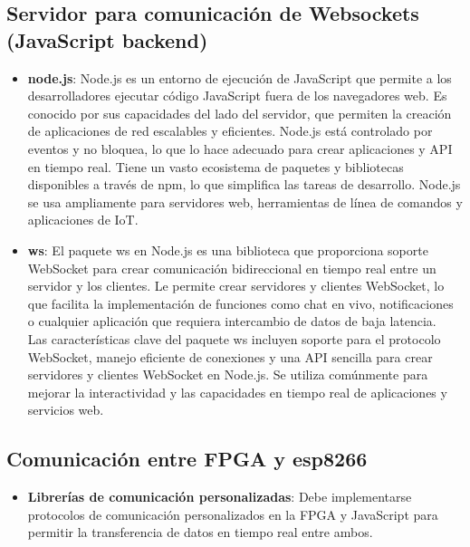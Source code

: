 \documentclass[journal]{IEEEtran}
\begin{document}
\subsection*{Servidor para comunicación de Websockets (JavaScript backend)}
\begin{itemize}
    \item \textbf{node.js}: 
    Node.js es un entorno de ejecución de JavaScript que permite a los desarrolladores ejecutar código JavaScript fuera de los navegadores web. Es conocido por sus capacidades del lado del servidor, que permiten la creación de aplicaciones de red escalables y eficientes. Node.js está controlado por eventos y no bloquea, lo que lo hace adecuado para crear aplicaciones y API en tiempo real. Tiene un vasto ecosistema de paquetes y bibliotecas disponibles a través de npm, lo que simplifica las tareas de desarrollo. Node.js se usa ampliamente para servidores web, herramientas de línea de comandos y aplicaciones de IoT.
    \item \textbf{ws}:
    El paquete ws en Node.js es una biblioteca que proporciona soporte WebSocket para crear comunicación bidireccional en tiempo real entre un servidor y los clientes. Le permite crear servidores y clientes WebSocket, lo que facilita la implementación de funciones como chat en vivo, notificaciones o cualquier aplicación que requiera intercambio de datos de baja latencia.
    \\
    Las características clave del paquete ws incluyen soporte para el protocolo WebSocket, manejo eficiente de conexiones y una API sencilla para crear servidores y clientes WebSocket en Node.js. Se utiliza comúnmente para mejorar la interactividad y las capacidades en tiempo real de aplicaciones y servicios web.

\end{itemize}



\subsection*{Comunicación entre FPGA y esp8266}

\begin{itemize}
  \item \textbf{Librerías de comunicación personalizadas}: Debe implementarse protocolos de comunicación personalizados en la FPGA y JavaScript para permitir la transferencia de datos en tiempo real entre ambos.
\end{itemize}
\end{document}
